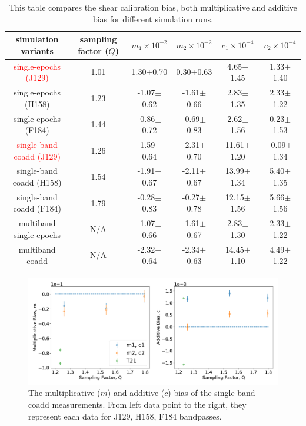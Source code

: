 \documentclass[fleqn,usenatbib]{mnras}
\begin{document}
\begin{table}
	\centering
	\label{tab:bias_summary}
	\begin{tabular}[scale=1.4]{ c|c|c|c|c|c } 
		\hline
		simulation variants & sampling factor ($Q$) & $m_{1}\times10^{-2}$ & $m_{2}\times10^{-2}$ & $c_{1}\times10^{-4}$ & $c_{2}\times10^{-4}$\\
		\hline
		\textcolor{red}{single-epochs (J129)} & 1.01 & 1.30$\pm$0.70 & 0.30$\pm$0.63 & 4.65$\pm$1.45 & 1.33$\pm$1.40\\
		single-epochs (H158) & 1.23 & -1.07$\pm$0.62 & -1.61$\pm$0.66 & 2.83$\pm$1.35 & 2.33$\pm$1.22\\
		single-epochs (F184) & 1.44 & -0.86$\pm$0.72 & -0.69$\pm$0.83 & 2.62$\pm$1.56 & 0.23$\pm$1.53\\
		\hline
		\textcolor{red}{single-band coadd (J129)} & 1.26 & -1.59$\pm$0.64 & -2.31$\pm$0.70 & 11.61$\pm$1.20 & -0.09$\pm$1.34\\
		single-band coadd (H158) & 1.54 & -1.91$\pm$0.67 & -2.11$\pm$0.67 & 13.99$\pm$1.34 & 5.40$\pm$1.35\\
		single-band coadd (F184) & 1.79 & -0.28$\pm$0.83 & -0.27$\pm$0.78 & 12.15$\pm$1.56 & 5.66$\pm$1.56\\
		\hline
		multiband single-epochs & N/A & -1.07$\pm$0.66 & -1.61$\pm$0.67 & 2.83$\pm$1.30 & 2.33$\pm$1.22 \\
		multiband coadd & N/A & -2.32$\pm$0.64 & -2.34$\pm$0.63 & 14.45$\pm$1.10 & 4.49$\pm$1.22\\
		
		\hline
	\end{tabular}
	\caption{This table compares the shear calibration bias, both multiplicative and additive bias for different simulation runs.}
	\label{tab:result}
\end{table}

\begin{figure}
	\includegraphics[scale=0.5]{final_result.pdf}
    \caption{The multiplicative ($m$) and additive ($c$) bias of the single-band coadd measurements. From left data point to the right, they represent each data for J129, H158, F184 bandpasses. }
    \label{fig:final_result}
\end{figure}
\end{document}

